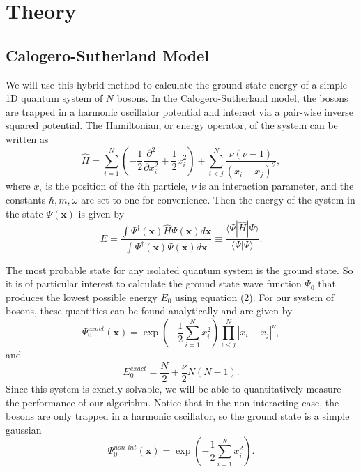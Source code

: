 \documentclass[prb,aps,twocolumn,showpacs,10pt]{revtex4-1}
\begin{document}

\section{Theory}


\subsection{Calogero-Sutherland Model}

We will use this hybrid method to calculate the ground state energy of a simple 1D quantum system of $N$ bosons. In the Calogero-Sutherland model, the bosons are trapped in a harmonic oscillator potential and interact via a pair-wise inverse squared potential. The Hamiltonian, or energy operator, of the system can be written as
\begin{equation}
\hat{H} = \sum_{i=1}^N \left( - \frac{1}{2}\frac{\partial^2}{\partial x_i^2} + \frac{1}{2} x_i^2 \right) + \sum_{i < j}^N \frac{\nu (\nu-1)}{(x_i-x_j)^2},
\end{equation}
where $x_i$ is the position of the $i$th particle, $\nu$ is an interaction parameter, and the constants $\hbar, m, \omega$ are set to one for convenience. Then the energy of the system in the state $\Psi(\bm{x})$ is given by
\begin{equation}
E = \frac{\int \Psi^\dag (\bm{x})\hat{H} \Psi(\bm{x}) d \bm{x} }{\int \Psi^\dag(\bm{x}) \Psi(\bm{x}) d \bm{x} }\equiv \frac{\langle \Psi | \hat{H} | \Psi \rangle}{\langle \Psi |  \Psi \rangle}.
\end{equation}

The most probable state for any isolated quantum system is the ground state. So it is of particular interest to calculate the ground state wave function $\Psi_0$ that produces the lowest possible energy $E_0$ using equation (2). For our system of bosons, these quantities can be found analytically and are given by
\begin{equation}
\Psi_0^{exact} (\bm{x}) = \exp \left( -\frac{1}{2}\sum_{i=1}^N x_i^2 \right) \prod_{i<j}^N | x_i-x_j |^\nu,
\end{equation}
and
\begin{equation}
E_0^{exact} = \frac{N}{2} + \frac{\nu}{2}N(N-1).
\end{equation}
Since this system is exactly solvable, we will be able to quantitatively measure the performance of our algorithm. Notice that in the non-interacting case, the bosons are only trapped in a harmonic oscillator, so the ground state is a simple gaussian
\begin{equation}
\Psi_0^{non\text{-}int} (\bm{x}) = \exp \left( -\frac{1}{2}\sum_{i=1}^N x_i^2 \right).
\end{equation}
\end{document}
